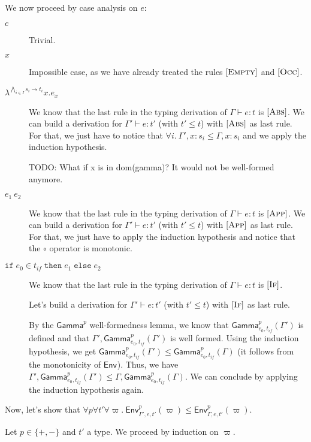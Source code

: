 \documentclass[a4paper]{article}%
\newcommand{\ite}[4]{\ensuremath{\texttt{if}\;#1\in#2\;\texttt{then}\;#3\;\texttt{else}\;#4}}
\newcommand{\Gp}[2]{\textsf{Env}^{#1}_{#2}}
\newcommand{\arrow}[2]{#1\to #2}
\newcommand{\Genv}[3]{\textsf{Gamma}^{#1}_{#2}(#3)}
\newcommand{\Ga}[2]{\textsf{Gamma}^{#1}_{#2}}
\theoremstyle{definition}
\newcommand {\Rule}[1] {[\textsc{#1}]}
\begin{document}
        We now proceed by case analysis on $e$:
        \begin{description}
          \item[$c$] Trivial.
          \item[$x$] Impossible case, as we have already treated the rules $\Rule{Empty}$ and $\Rule{Occ}$.
          \item[$\lambda^{\bigwedge_{i\in I} \arrow {s_i} {t_i}}x.e_x$] We know that the last rule in the typing derivation of $\Gamma \vdash e:t$ is $\Rule {Abs}$.
          We can build a derivation for $\Gamma' \vdash e:t'$ (with $t'\leq t$) with $\Rule {Abs}$ as last rule.
          For that, we just have to notice that $\forall i.\ \Gamma',x:s_i \leq \Gamma,x:s_i$ and we apply the induction hypothesis.
          
          TODO: What if x is in dom(gamma)? It would not be well-formed anymore.

          \item[$e_1\ e_2$] We know that the last rule in the typing derivation of $\Gamma \vdash e:t$ is $\Rule {App}$.
          We can build a derivation for $\Gamma' \vdash e:t'$ (with $t'\leq t$) with $\Rule {App}$ as last rule.
          For that, we just have to apply the induction hypothesis and notice that the $\circ$ operator is monotonic.
          \item[$\ite {e_0} {t_{if}} {e_1} {e_2}$]
          We know that the last rule in the typing derivation of $\Gamma \vdash e:t$ is $\Rule {If}$.

          Let's build a derivation for $\Gamma' \vdash e:t'$ (with $t'\leq t$) with $\Rule {If}$ as last rule.

          By the $\Ga p {}$ well-formedness lemma, we know that $\Genv p {e_0,t_{if}} {\Gamma'}$ is defined and that $\Gamma',\Genv p {e_0,t_{if}} {\Gamma'}$ is well formed.
          Using the induction hypothesis, we get $\Genv p {e_0,t_{if}} {\Gamma'} \leq \Genv p {e_0,t_{if}} \Gamma$ (it follows from the monotonicity of $\Gp {} {}$).
          Thus, we have $\Gamma',\Genv p {e_0,t_{if}} {\Gamma'} \leq \Gamma,\Genv p {e_0,t_{if}} \Gamma$.
          We can conclude by applying the induction hypothesis again.\\
        \end{description}
    
        Now, let's show that $\forall p \forall t' \forall \varpi.\ \Gp p {\Gamma',e,t'} (\varpi) \leq \Gp p {\Gamma,e,t'} (\varpi)$.
    
        Let $p\in \{+,-\}$ and $t'$ a type.
        We proceed by induction on $\varpi$.
        
\end{document}
